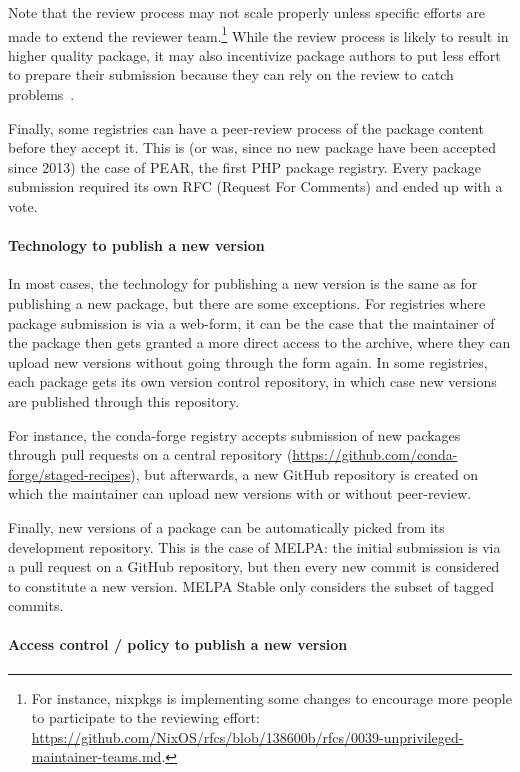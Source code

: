 Note that the review process may not scale properly unless specific efforts are made to extend the reviewer team.\footnote{
	For instance, nixpkgs is implementing some changes to encourage more people to participate to the reviewing effort: \url{https://github.com/NixOS/rfcs/blob/138600b/rfcs/0039-unprivileged-maintainer-teams.md}.
}
While the review process is likely to result in higher quality package, it may also incentivize package authors to put less effort to prepare their submission because they can rely on the review to catch problems~\cite{duran2014cocoapods}.

Finally, some registries can have a peer-review process of the package content before they accept it.
This is (or was, since no new package have been accepted since 2013) the case of PEAR, the first PHP package registry.
Every package submission required its own RFC (Request For Comments) and ended up with a vote.

\paragraph{Technology to publish a new version}

In most cases, the technology for publishing a new version is the same as for publishing a new package, but there are some exceptions.
For registries where package submission is via a web-form, it can be the case that the maintainer of the package then gets granted a more direct access to the archive, where they can upload new versions without going through the form again.
In some registries, each package gets its own version control repository, in which case new versions are published through this repository.

For instance, the conda-forge registry accepts submission of new packages through pull requests on a central repository (\url{https://github.com/conda-forge/staged-recipes}), but afterwards, a new GitHub repository is created on which the maintainer can upload new versions with or without peer-review.

Finally, new versions of a package can be automatically picked from its development repository.
This is the case of MELPA: the initial submission is via a pull request on a GitHub repository, but then every new commit is considered to constitute a new version.
MELPA Stable only considers the subset of tagged commits.

\paragraph{Access control / policy to publish a new version}


